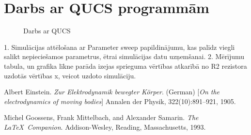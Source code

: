 \documentclass{report}
\begin{document}
\section{Darbs ar QUCS programmām}
\begin{figure}[!h]
    \centering
{}
    \caption{Darbs ar QUCS}
    \label{4}
\end{figure}




1. Simulācijas attēlošana ar Parameter sweep papildinājumu, kas palīdz viegli salikt nepieciešamos parametrus, ētrai simulācijas datu uzņemšanai.
2. Mērījumu tabula, un grafika līkne parāda izejas sprieguma vērtības atkarībā no R2 rezistora uzdotās vērtības x, veicot uzdoto simulāciju.




\begin{thebibliography}{9}
Albert Einstein. 
\textit{Zur Elektrodynamik bewegter K{\"o}rper}. (German) 
[\textit{On the electrodynamics of moving bodies}]
Annalen der Physik, 322(10):891–921, 1905.

Michel Goossens, Frank Mittelbach, and Alexander Samarin. 
\textit{The \LaTeX\ Companion}. 
Addison-Wesley, Reading, Massachusetts, 1993.
\end{thebibliography}
\end{document}
